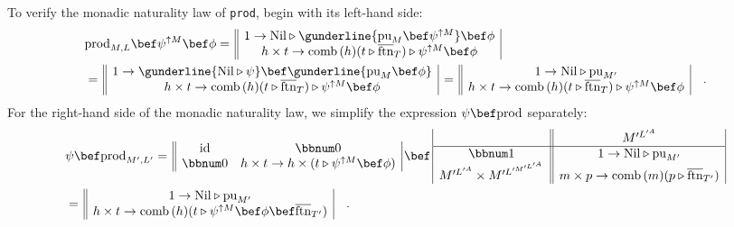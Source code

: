To verify the monadic naturality law of \lstinline!prod!, begin with
its left-hand side:
\begin{align*}
 & \text{prod}_{M,L}\bef\psi^{\uparrow M}\bef\phi=\,\begin{array}{||c|}
1\rightarrow\text{Nil}\triangleright\gunderline{\text{pu}_{M}\bef\psi^{\uparrow M}}\bef\phi\\
h\times t\rightarrow\text{comb}\,(h)(t\triangleright\overline{\text{ftn}}_{T})\triangleright\psi^{\uparrow M}\bef\phi
\end{array}\\
 & =\,\begin{array}{||c|}
1\rightarrow\gunderline{\text{Nil}\triangleright\psi}\bef\gunderline{\text{pu}_{M}\bef\phi}\\
h\times t\rightarrow\text{comb}\,(h)(t\triangleright\overline{\text{ftn}}_{T})\triangleright\psi^{\uparrow M}\bef\phi
\end{array}\,=\,\begin{array}{||c|}
1\rightarrow\text{Nil}\triangleright\text{pu}_{M^{\prime}}\\
h\times t\rightarrow\text{comb}\,(h)(t\triangleright\overline{\text{ftn}}_{T})\triangleright\psi^{\uparrow M}\bef\phi
\end{array}\quad.
\end{align*}
For the right-hand side of the monadic naturality law, we simplify
the expression $\psi\bef\text{prod}$ separately:
\begin{align*}
 & \psi\bef\text{prod}_{M^{\prime},L^{\prime}}=\,\begin{array}{||cc|}
\text{id} & \bbnum 0\\
\bbnum 0 & h\times t\rightarrow h\times(t\triangleright\psi^{\uparrow M}\bef\phi)
\end{array}\,\bef\,\begin{array}{|c||c|}
 & M^{\prime L^{\prime A}}\\
\hline \bbnum 1 & 1\rightarrow\text{Nil}\triangleright\text{pu}_{M^{\prime}}\\
M^{\prime L^{\prime A}}\times M^{\prime L^{\prime M^{\prime L^{\prime A}}}} & m\times p\rightarrow\text{comb}\,(m)(p\triangleright\overline{\text{ftn}}_{T^{\prime}})
\end{array}\\
 & =\,\begin{array}{||c|}
1\rightarrow\text{Nil}\triangleright\text{pu}_{M^{\prime}}\\
h\times t\rightarrow\text{comb}\,(h)(t\triangleright\psi^{\uparrow M}\bef\phi\bef\overline{\text{ftn}}_{T^{\prime}})
\end{array}\quad.
\end{align*}
